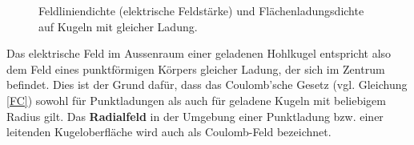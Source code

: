 \documentclass[11pt,twoside=false,open=any]{scrbook}
\begin{document}
\begin{figure}[h]
\begin{center}

\caption{Feldliniendichte (elektrische Feldstärke) und Flächenladungsdichte auf Kugeln mit gleicher Ladung.}
\label{kugeln}
\end{center}
\end{figure}

Das elektrische Feld im Aussenraum einer geladenen Hohlkugel entspricht also dem Feld eines punktförmigen Körpers gleicher Ladung, der sich im Zentrum befindet. Dies ist der Grund dafür, dass das Coulomb'sche Gesetz (vgl. Gleichung \ref{FC}) sowohl für Punktladungen als auch für geladene Kugeln mit beliebigem Radius gilt. Das \textbf{Radialfeld} in der Umgebung einer Punktladung bzw. einer leitenden Kugeloberfläche wird auch als Coulomb-Feld bezeichnet.

\begin{center}
   \setlength{\fboxrule}{2pt}
\end{center}

\begin{center}
   \setlength{\fboxrule}{2pt}
\end{center}
\end{document}
